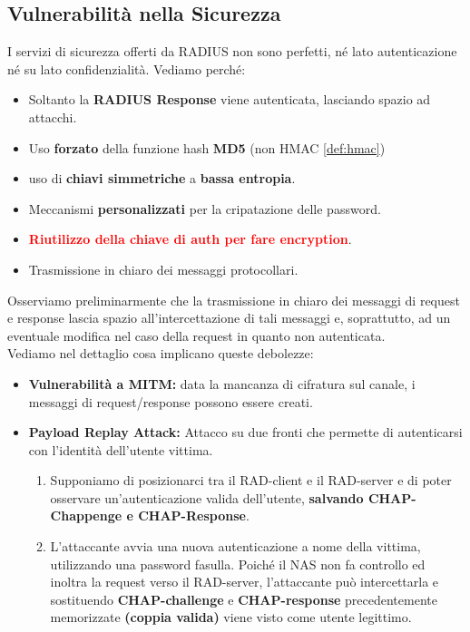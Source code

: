 \subsection{Vulnerabilità nella Sicurezza}
I servizi di sicurezza offerti da RADIUS non sono perfetti, né lato autenticazione né su lato confidenzialità. Vediamo perché:
\begin{corollary}
\begin{itemize}
    \item Soltanto la \textbf{RADIUS Response} viene autenticata, lasciando spazio ad attacchi.
    \item Uso \textbf{forzato} della funzione hash \textbf{MD5} (non HMAC \cref{def:hmac})
    \item uso di \textbf{chiavi simmetriche} a \textbf{bassa entropia}.
\end{itemize}
\end{corollary}
\begin{corollary}
\begin{itemize}
    \item Meccanismi \textbf{personalizzati} per la cripatazione delle password.
    \item \textcolor{red}{\textbf{Riutilizzo della chiave di auth per fare encryption}}.
    \item Trasmissione in chiaro dei messaggi protocollari.
\end{itemize}
\end{corollary}
Osserviamo preliminarmente che la trasmissione in chiaro dei messaggi di request e response lascia spazio all'intercettazione di tali messaggi e, soprattutto, ad un eventuale modifica nel caso della request in quanto non autenticata.\\
Vediamo nel dettaglio cosa implicano queste debolezze:
\begin{proposition}
\begin{itemize}
    \item \textbf{Vulnerabilità a MITM:} data la mancanza di cifratura sul canale, i messaggi di request/response possono essere creati.
    \item \textbf{Payload Replay Attack:} Attacco su due fronti che permette di autenticarsi con l'identità dell'utente vittima.
    \begin{enumerate}
        \item Supponiamo di posizionarci tra il RAD-client e il RAD-server e di poter osservare un'autenticazione valida dell'utente, \textbf{salvando CHAP-Chappenge e CHAP-Response}. 
        \item L'attaccante avvia una nuova autenticazione a nome della vittima, utilizzando una password fasulla. Poiché il NAS non fa controllo ed inoltra la request verso il RAD-server, l'attaccante può intercettarla e sostituendo \textbf{CHAP-challenge} e \textbf{CHAP-response} precedentemente memorizzate \textbf{(coppia valida)} viene visto come utente legittimo.
    \end{enumerate}
\end{itemize}
\end{proposition}
